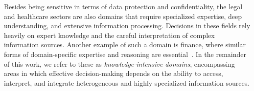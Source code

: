 



Besides being sensitive in terms of data protection and confidentiality, the legal and healthcare sectors are also domains that require specialized expertise, deep understanding, and extensive information processing. Decisions in these fields rely heavily on expert knowledge and the careful interpretation of complex information sources. Another example of such a domain is finance, where similar forms of domain-specific expertise and reasoning are essential~\cite{niu-etal-2025-tree,cambridge-knowledge-intensive,kg-intensive-nlu-xai-2021}. In the remainder of this work, we refer to these as \emph{knowledge-intensive domains}, encompassing areas in which effective decision-making depends on the ability to access, interpret, and integrate heterogeneous and highly specialized information sources.

